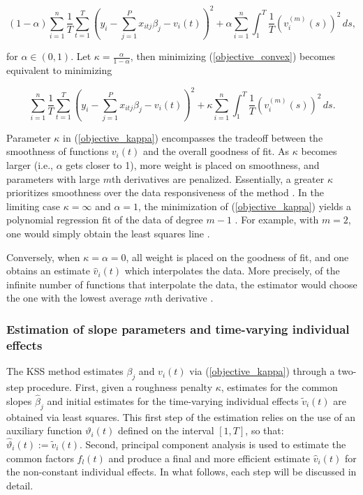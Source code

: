 \begin{equation}\label{objective_convex}
    (1- \alpha) \sum_{i=1}^n \frac{1}{T} \sum_{t=1}^T\left(y_i-  \sum_{j=1}^P x_{itj} \beta_j - v_i(t)\right)^2 + \alpha  \sum_{i=1}^n \int_1^T \frac{1}{T} \left(v_i^{(m)}(s)\right)^2  \, d s ,
\end{equation}


for $\alpha \in (0,1)$. Let $\kappa = \frac{\alpha}{1 - \alpha}$, then minimizing (\ref{objective_convex}) becomes equivalent to minimizing

\begin{equation}\label{objective_kappa}
    \sum_{i=1}^n \frac{1}{T} \sum_{t=1}^T\left(y_i-  \sum_{j=1}^P x_{itj} \beta_j - v_i(t)\right)^2 + \kappa \sum_{i=1}^n \int_1^T \frac{1}{T} \left(v_i^{(m)}(s)\right)^2  \, d s .
\end{equation}

Parameter $\kappa$ in (\ref{objective_kappa}) encompasses the tradeoff between the smoothness of functions $v_i(t)$ and the overall goodness of fit. As $\kappa$ becomes larger (i.e., $\alpha$ gets closer to 1), more weight is placed on smoothness, and parameters with large $m$th derivatives are penalized. Essentially, a greater $\kappa$ prioritizes smoothness over the data responsiveness of the method \citep{hastie2009elements, shalizi2016advanced}. In the limiting case $\kappa = \infty$ and $\alpha = 1$, the minimization of (\ref{objective_kappa}) yields a polynomial regression fit of the data of degree $m-1$ \citep{eubank1999nonparametric, de2001practical, kneip2012new}. For example, with $m=2$, one would simply obtain the least squares line \citep{wasserman2006all, shalizi2016advanced}.  

Conversely, when $\kappa = \alpha = 0$, all weight is placed on the goodness of fit, and one obtains an estimate $\hat{v}_i(t)$ which interpolates the data. More precisely, of the infinite number of functions that interpolate the data, the estimator would choose the one with the lowest average $m$th derivative \citep{eubank1999nonparametric, wasserman2006all, shalizi2016advanced}. 



\subsubsection{Estimation of slope parameters and time-varying individual effects}
The \ac{KSS} method estimates $\beta_j$ and $v_i(t)$ via (\ref{objective_kappa}) through a two-step procedure. First, given a roughness penalty $\kappa$, estimates for the common slopes  $\hat{\beta}_j$ and initial estimates for the time-varying individual effects $\tilde{v}_i(t)$ are obtained via least squares. This first step of the estimation relies on the use of an auxiliary function $\vartheta_i(t)$ defined on the interval $[1,T]$, so that: 
$\hat{\vartheta}_i(t) := \tilde{v}_i(t)$. Second, principal component analysis is used to estimate the common factors $f_l(t)$ and produce a final and more efficient estimate $\hat{v}_i(t)$ for the non-constant individual effects. In what follows, each step will be discussed in detail. 

